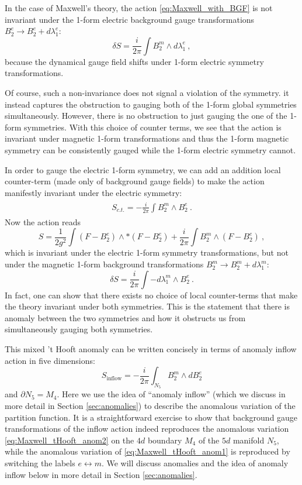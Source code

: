 \documentclass[11pt]{article}
\newcommand{\eq}[1]{\begin{align}\begin{split}#1\end{split}\end{align}}
\def\beq{\begin{equation}}
\def\eeq{\end{equation}}
\begin{document}
In the case of Maxwell's theory, the action \eqref{eq:Maxwell_with_BGF} is not invariant under the 1-form electric background gauge transformations $B_2^e \to B_2^e + d \lambda_1^e$:
%
\beq
\delta S = \frac{i}{2\pi} \int B_2^m \wedge d \lambda_1^e~,
\label{eq:Maxwell_tHooft_anom1}
\eeq
%
because the dynamical gauge field shifts under 1-form electric symmetry transformations. 

Of course, such a non-invariance does not signal a violation of the symmetry. it instead captures the obstruction to gauging both of the 1-form global symmetries simultaneously. However, there is no obstruction to just gauging the one of the 1-form symmetries. With this choice of counter terms, we see that the action is invariant under magnetic 1-form transformations and thus the 1-form magnetic symmetry can be consistently gauged while the 1-form electric symmetry cannot. 
 
In order to gauge the electric 1-form symmetry, we can add an addition local counter-term (made only of background gauge fields) to make the action manifestly invariant under the electric symmetry:
\eq{
S_{c.t.}=-\frac{i}{2\pi}\int B_2^m\wedge B_2^e~.
}
Now the action reads 
%
\beq
S = \frac{1}{2g^2} \int \left( F - B_2^e \right) \wedge \ast  \left( F - B_2^e \right) + \frac{i}{2\pi} \int B_2^m \wedge \left( F - B_2^e \right)~,
\label{eq:Maxwell_with_BGF_2}
\eeq
%
which is invariant under the electric 1-form symmetry transformations, but   not  under the magnetic 1-form background transformations $B_2^m \to B_2^m + d \lambda_1^m$:
%
\beq
\delta S = \frac{i}{2\pi} \int - d \lambda_1^m \wedge B_2^e~.
\label{eq:Maxwell_tHooft_anom2}
\eeq
% 
In fact, one can show that there exists no choice of local counter-terms that make the theory invariant under both symmetries. This is the statement that there is anomaly between the two symmetries and how it obstructs us from simultaneously gauging both symmetries. 

This mixed 't Hooft anomaly can be written concisely in terms of anomaly inflow action in five dimensions:
%
\beq
S_{\scriptscriptstyle \text{inflow}} = -\frac{i}{2\pi}\int_{N_5}  B_2^m \wedge d B_2^e
\eeq
%
and $\partial N_5 = M_4$. 
Here we use the idea of ``anomaly inflow'' (which we discuss in more detail in Section \ref{sec:anomalies}) 
to describe the anomalous variation of the partition function. 
 It is a straightforward exercise to show that background gauge transformations of the inflow action indeed reproduces the anomalous variation \eqref{eq:Maxwell_tHooft_anom2} on the $4d$ boundary $M_4$ of the $5d$ manifold $N_5$, while the anomalous variation of \eqref{eq:Maxwell_tHooft_anom1} is reproduced by switching the labels $e\leftrightarrow m$. We will discuss anomalies and the idea of anomaly inflow below in more detail in Section \ref{sec:anomalies}. 
\end{document}
